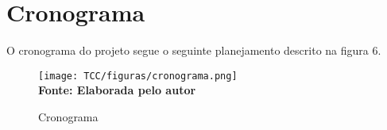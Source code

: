 \chapter{Cronograma}
\label{Cronograma}

O cronograma do projeto segue o seguinte planejamento descrito na figura 6.

\begin{figure}[H]
	\centering	
	\caption[\hspace{0.1cm}Cronograma]{Cronograma}
	  \vspace{-0.4cm}
	\texttt{[image: TCC/figuras/cronograma.png]}
	 \vspace{-0.3cm}
	\\\textbf{\footnotesize Fonte: Elaborada pelo autor}
	\label{fig:tela1}
\end{figure}
